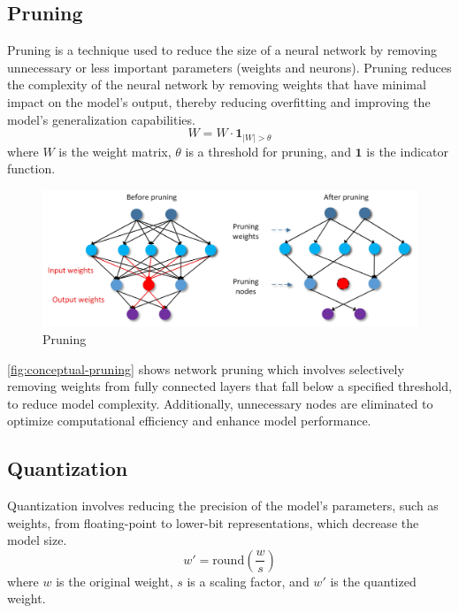 \documentclass{ioereport}
\begin{document}
    \subsection{Pruning}
    Pruning is a technique used to reduce the size of a neural network by removing unnecessary or less important parameters (weights and neurons). Pruning reduces the complexity of the neural network by removing weights that have minimal impact on the model’s output, thereby reducing overfitting and improving the model's generalization capabilities.
    \begin{equation}
        W = W \cdot \mathbf{1}_{|W| > \theta}
    \end{equation}
    where \( W \) is the weight matrix, \( \theta \) is a threshold for pruning, and \( \mathbf{1} \) is the indicator function.

    \begin{figure}[H]
            \centering
            \includegraphics[width=\linewidth]{assets/conceptual figure of pruning.png}
            \caption{Pruning}
            \label{fig:conceptual-pruning}
    \end{figure}
    \autoref{fig:conceptual-pruning} shows network pruning which involves selectively removing weights from fully connected layers that fall below a specified threshold, to reduce model complexity. Additionally, unnecessary nodes are eliminated to optimize computational efficiency and enhance model performance.
    
    \subsection{Quantization}
    Quantization involves reducing the precision of the model's parameters, such as weights, from floating-point to lower-bit representations, which decrease the model size.
    \begin{equation}
        w' = \text{round}\left(\frac{w}{s}\right)
    \end{equation}
    where \( w \) is the original weight, \( s \) is a scaling factor, and \( w' \) is the quantized weight.
\end{document}
